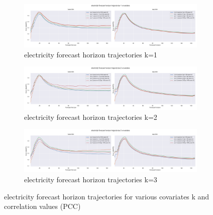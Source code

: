 \documentclass{article}
\begin{document}
\begin{figure}[tbp]

\begin{subfigure}{\textwidth}
\centering
\includegraphics[width=\linewidth]{figures/models_elec_k1.png}
\caption{electricity forecast horizon trajectories k=1}
\label{fig:base-lstm_seg-lstm_electricity_k_1_trajectory}
\end{subfigure}

\begin{subfigure}{\textwidth}
\centering
\includegraphics[width=\linewidth]{figures/models_elec_k2.png}
\caption{electricity forecast horizon trajectories k=2}
\label{fig:base-lstm_seg-lstm_electricity_k_2_trajectory}
\end{subfigure}

\begin{subfigure}{\textwidth}
\centering
\includegraphics[width=\linewidth]{figures/models_elec_k3.png}
\caption{electricity forecast horizon trajectories k=3}
\label{fig:base-lstm_seg-lstm_electricity_k_3_trajectory}
\end{subfigure}
\caption{electricity forecast horizon trajectories for various covariates k and correlation values (PCC)}
\label{fig:base-lstm_seg-lstm_electricity_trajectory}
\end{figure}
\end{document}
